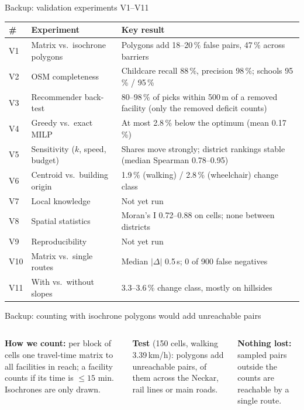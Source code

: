 \documentclass[aspectratio=169,10pt]{beamer}
\begin{document}
\begin{frame}{Backup: validation experiments V1--V11}
  \scriptsize
  \begin{tabular}{@{}llP{95mm}@{}}
    \toprule
    \# & Experiment & Key result \\
    \midrule
    V1 & Matrix vs.\ isochrone polygons & Polygons add 18--20\,\% false pairs, 47\,\% across barriers \\
    V2 & OSM completeness & Childcare recall 88\,\%, precision 98\,\%; schools 95\,\% / 95\,\% \\
    V3 & Recommender back-test & 80--98\,\% of picks within 500\,m of a removed facility (only the removed deficit counts) \\
    V4 & Greedy vs.\ exact MILP & At most 2.8\,\% below the optimum (mean 0.17\,\%) \\
    V5 & Sensitivity ($k$, speed, budget) & Shares move strongly; district rankings stable
      (median Spearman 0.78--0.95) \\
    V6 & Centroid vs.\ building origin & 1.9\,\% (walking) / 2.8\,\% (wheelchair) change class \\
    V7 & Local knowledge & Not yet run \\
    V8 & Spatial statistics & Moran's I 0.72--0.88 on cells; none between districts \\
    V9 & Reproducibility & Not yet run \\
    V10 & Matrix vs.\ single routes & Median $|\Delta|$ 0.5\,s; 0 of 900 false negatives \\
    V11 & With vs.\ without slopes & 3.3--3.6\,\% change class, mostly on hillsides \\
    \bottomrule
  \end{tabular}
\end{frame}

\begin{frame}{Backup: counting with isochrone polygons would add \factVOneOvercount{}
  unreachable pairs}
  \begin{columns}[T,onlytextwidth]
      \centering\isochronetrap
      \footnotesize
      \textbf{How we count:} per block of cells one travel-time matrix to all facilities in
      reach; a facility counts if its time is $\le 15$ min. Isochrones are only drawn.
      \par\medskip
      \textbf{Test} (150 cells, walking 3.39\,km/h): polygons add \factVOneOvercount{}
      unreachable pairs, \factVOneBarrier{} of them across the Neckar, rail lines or main
      roads.\par\medskip
      \textbf{Nothing lost:} \factCurFalseNeg{} sampled pairs outside the counts are
      reachable by a single route.
  \end{columns}
\end{frame}
\end{document}
